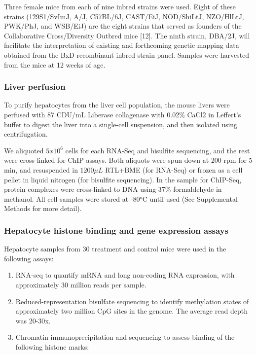 \documentclass[10pt,letterpaper]{article}
\providecommand{\tightlist}{%
  \setlength{\itemsep}{0pt}\setlength{\parskip}{0pt}}
\begin{document}
Three female mice from each of nine inbred strains were used. Eight of
these strains (129S1/SvImJ, A/J, C57BL/6J, CAST/EiJ, NOD/ShiLtJ,
NZO/HlLtJ, PWK/PhJ, and WSB/EiJ) are the eight strains that served as
founders of the Collaborative Cross/Diversity Outbred mice {[}12{]}. The
ninth strain, DBA/2J, will facilitate the interpretation of existing and
forthcoming genetic mapping data obtained from the BxD recombinant
inbred strain panel. Samples were harvested from the mice at 12 weeks of
age.

\hypertarget{liver-perfusion}{%
\subsubsection{Liver perfusion}\label{liver-perfusion}}

To purify hepatocytes from the liver cell population, the mouse livers
were perfused with 87 CDU/mL Liberase collagenase with 0.02\% CaCl2 in
Leffert's buffer to digest the liver into a single-cell suspension, and
then isolated using centrifugation.

We aliquoted \(5 x 10^{6}\) cells for each RNA-Seq and bisulfite
sequencing, and the rest were cross-linked for ChIP assays. Both
aliquots were spun down at 200 rpm for 5 min, and resuspended in
\(1200\mu L\) RTL+BME (for RNA-Seq) or frozen as a cell pellet in liquid
nitrogen (for bisulfite sequencing). In the sample for ChIP-Seq, protein
complexes were cross-linked to DNA using 37\% formaldehyde in methanol.
All cell samples were stored at -80°C until used (See Supplemental
Methods for more detail).

\hypertarget{hepatocyte-histone-binding-and-gene-expression-assays}{%
\subsubsection{Hepatocyte histone binding and gene expression
assays}\label{hepatocyte-histone-binding-and-gene-expression-assays}}

Hepatocyte samples from 30 treatment and control mice were used in the
following assays:

\begin{enumerate}
\def\labelenumi{\arabic{enumi}.}
\tightlist
\item
  RNA-seq to quantify mRNA and long non-coding RNA expression, with
  approximately 30 million reads per sample.
\item
  Reduced-representation bisulfate sequencing to identify methylation
  states of approximately two million CpG sites in the genome. The
  average read depth was 20-30x.
\item
  Chromatin immunoprecipitation and sequencing to assess binding of the
  following histone marks:
\end{enumerate}
\end{document}
